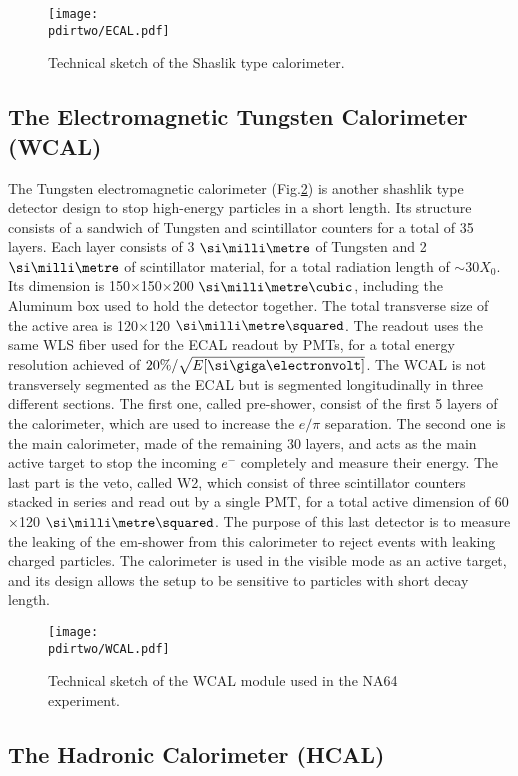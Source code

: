 \begin{figure}[bth!]
\centering
\texttt{[image: \\pdirtwo/ECAL.pdf]}
\caption[ECAL sketch]{Technical sketch of the Shaslik type calorimeter.}
\label{fig:ecal-sketch}
\end{figure}

\subsection{The Electromagnetic Tungsten Calorimeter (WCAL)}

The Tungsten electromagnetic calorimeter (Fig.\ref{fig:wcal-sketch}) is another shashlik type detector design to stop high-energy particles in a short length. Its structure consists of a sandwich of Tungsten and scintillator counters for a total of 35 layers. Each layer consists of 3 $\mmi$ of Tungsten and 2 $\mmi$ of scintillator material, for a total radiation length of $\sim$30$X_0$. Its dimension is 150$\times$150$\times$200 $\mmc$, including the Aluminum box used to hold the detector together. The total transverse size of the active area is 120$\times$120 $\mms$. The readout uses the same WLS fiber used for the ECAL readout by PMTs, for a total energy resolution achieved of $20\%/ \sqrt{E[\gev]}$. The WCAL is not transversely segmented as the ECAL but is segmented longitudinally in three different sections. The first one, called pre-shower, consist of the first 5 layers of the calorimeter, which are used to increase the $e/\pi$ separation. The second one is the main calorimeter, made of the remaining 30 layers, and acts as the main active target to stop the incoming $e^-$ completely and measure their energy. The last part is the veto, called W2, which consist of three scintillator counters stacked in series and read out by a single PMT, for a total active dimension of 60$\times$120 $\mms$. The purpose of this last detector is to measure the leaking of the em-shower from this calorimeter to reject events with leaking charged particles. The calorimeter is used in the visible mode as an active target, and its design allows the setup to be sensitive to particles with short decay length.

\begin{figure}[bth!]
\centering
\texttt{[image: \\pdirtwo/WCAL.pdf]}
\caption[WCAL sketch]{Technical sketch of the WCAL module used in the NA64 experiment.}
\label{fig:wcal-sketch}
\end{figure}


\subsection{The Hadronic Calorimeter (HCAL)}
\label{ch2:sec:detectors-hcal}

